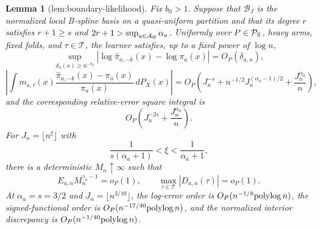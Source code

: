 \documentclass{article}
\newtheorem{lemma}{Lemma}
\begin{document}
\begin{lemma}[lem:boundary-likelihood]\label{lem:boundary-likelihood}
Fix \(b_0>1\).  Suppose that \(\mathcal B_J\) is the normalized local B-spline basis on a quasi-uniform partition and that its degree \(r\) satisfies \(r+1\ge s\) and \(2r+1>\sup_{a\in\mathcal A_{\rm H}}\alpha_a\).  Uniformly over \(P\in\mathcal P_{\rm S}\), heavy arms, fixed folds, and \(\tau\in\mathcal T\), the learner satisfies, up to a fixed power of \(\log n\),
\[
\sup_{d_a(x)\ge n^{-b_0}}
\left|\log\widehat\pi_{a,-k}(x)-\log\pi_a(x)\right|
=O_P(\delta_{a,n}),
\]
\[
\left|\int m_{a,\tau}(x)
\frac{\widehat\pi_{a,-k}(x)-\pi_a(x)}{\pi_a(x)}\,dP_X(x)\right|
=O_P\!\left(J_n^{-s}+n^{-1/2}J_n^{(\alpha_a-1)/2}
+\frac{J_n^{\alpha_a}}n\right),
\]
and the corresponding relative-error square integral is
\[
O_P\!\left(J_n^{-2s}+\frac{J_n^{\alpha_a}}n\right).
\]
For \(J_n=\lfloor n^\xi\rfloor\) with
\[
\frac1{s(\alpha_a+1)}<\xi<\frac1{\alpha_a+1},
\]
there is a deterministic \(M_n\uparrow\infty\) such that
\[
E_{a,n}M_n^{\gamma_a-1}=o_P(1),
\qquad
\max_{\tau\in\mathcal T}|D_{a,n}(\tau)|=o_P(1).
\]
At \(\alpha_a=s=3/2\) and \(J_n=\lfloor n^{3/10}\rfloor\), the log-error order is \(O_P(n^{-1/8}{\rm polylog}\,n)\), the signed-functional order is \(O_P(n^{-17/40}{\rm polylog}\,n)\), and the normalized interior discrepancy is \(O_P(n^{-1/40}{\rm polylog}\,n)\).
\end{lemma}
\end{document}
